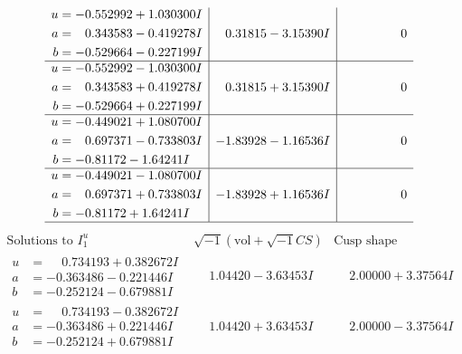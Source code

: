 \documentclass[1p]{elsarticle_modified}
\theoremstyle{definition}
\newcommand{\I}{\sqrt{-1}}
\begin{document}
$$\begin{array}{c|c|c}
\begin{aligned}
u &= -0.552992 + 1.030300 I \\
a &= \phantom{-}0.343583 - 0.419278 I \\
b &= -0.529664 - 0.227199 I\end{aligned}
 & \phantom{-}0.31815 - 3.15390 I & \phantom{-0.000000 } 0 \\ \hline\begin{aligned}
u &= -0.552992 - 1.030300 I \\
a &= \phantom{-}0.343583 + 0.419278 I \\
b &= -0.529664 + 0.227199 I\end{aligned}
 & \phantom{-}0.31815 + 3.15390 I & \phantom{-0.000000 } 0 \\ \hline\begin{aligned}
u &= -0.449021 + 1.080700 I \\
a &= \phantom{-}0.697371 - 0.733803 I \\
b &= -0.81172 - 1.64241 I\end{aligned}
 & -1.83928 - 1.16536 I & \phantom{-0.000000 } 0 \\ \hline\begin{aligned}
u &= -0.449021 - 1.080700 I \\
a &= \phantom{-}0.697371 + 0.733803 I \\
b &= -0.81172 + 1.64241 I\end{aligned}
 & -1.83928 + 1.16536 I & \phantom{-0.000000 } 0\\
 \hline 
 \end{array}$$\newpage$$\begin{array}{c|c|c}  
\text{Solutions to }I^u_{1}& \I (\text{vol} + \sqrt{-1}CS) & \text{Cusp shape}\\
 \hline 
\begin{aligned}
u &= \phantom{-}0.734193 + 0.382672 I \\
a &= -0.363486 - 0.221446 I \\
b &= -0.252124 - 0.679881 I\end{aligned}
 & \phantom{-}1.04420 - 3.63453 I & \phantom{-}2.00000 + 3.37564 I \\ \hline\begin{aligned}
u &= \phantom{-}0.734193 - 0.382672 I \\
a &= -0.363486 + 0.221446 I \\
b &= -0.252124 + 0.679881 I\end{aligned}
 & \phantom{-}1.04420 + 3.63453 I & \phantom{-}2.00000 - 3.37564 I \\ \hline\begin{aligned}

\end{aligned}
\end{array}$$
\end{document}

